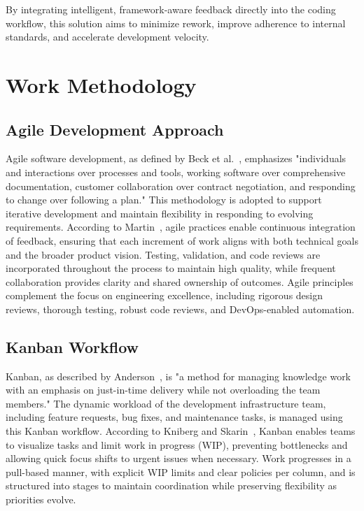 \begin{spacing}{1.2}
By integrating intelligent, framework-aware feedback directly into the coding workflow, this solution aims to minimize rework, improve adherence to internal standards, and accelerate development velocity.  

\section{Work Methodology}

\subsection{Agile Development Approach}
Agile software development, as defined by Beck et al.~\cite{beck2001agile}, emphasizes "individuals and interactions over processes and tools, working software over comprehensive documentation, customer collaboration over contract negotiation, and responding to change over following a plan." This methodology is adopted to support iterative development and maintain flexibility in responding to evolving requirements. According to Martin~\cite{martin2003agile}, agile practices enable continuous integration of feedback, ensuring that each increment of work aligns with both technical goals and the broader product vision. Testing, validation, and code reviews are incorporated throughout the process to maintain high quality, while frequent collaboration provides clarity and shared ownership of outcomes. Agile principles complement the focus on engineering excellence, including rigorous design reviews, thorough testing, robust code reviews, and DevOps-enabled automation.

\subsection{Kanban Workflow}
Kanban, as described by Anderson~\cite{anderson2010kanban}, is "a method for managing knowledge work with an emphasis on just-in-time delivery while not overloading the team members." The dynamic workload of the development infrastructure team, including feature requests, bug fixes, and maintenance tasks, is managed using this Kanban workflow. According to Kniberg and Skarin~\cite{kniberg2011kanban}, Kanban enables teams to visualize tasks and limit work in progress (WIP), preventing bottlenecks and allowing quick focus shifts to urgent issues when necessary. Work progresses in a pull-based manner, with explicit WIP limits and clear policies per column, and is structured into stages to maintain coordination while preserving flexibility as priorities evolve.  


\end{spacing}
